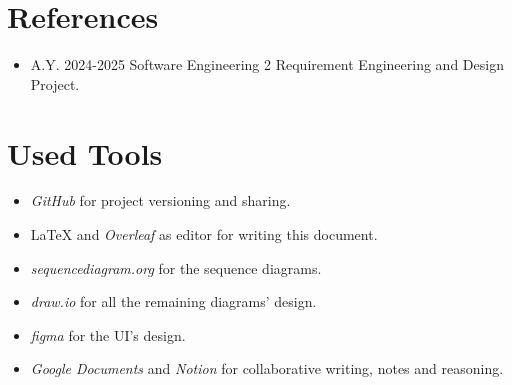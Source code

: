 \section{References}
\label{sec:references}%

\begin{itemize}
    \item A.Y. 2024-2025 Software Engineering 2 Requirement Engineering and Design Project.
\end{itemize}

\section{Used Tools}
\label{sec:used_tools}%
\begin{itemize}
    \item \textit{GitHub} for project versioning and sharing.
    \item \LaTeX{} and \textit{Overleaf} as editor for writing this document.
    \item \textit{sequencediagram.org} for the sequence diagrams.
    \item \textit{draw.io} for all the remaining diagrams' design.
    \item \textit{figma} for the UI's design.
    \item \textit{Google Documents} and \textit{Notion} for collaborative writing, notes and reasoning.
\end{itemize}